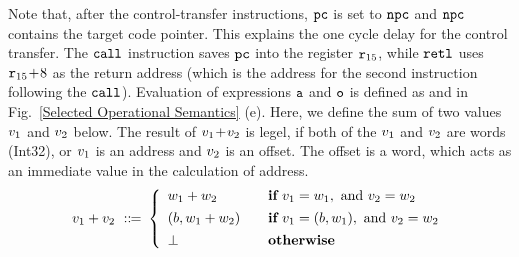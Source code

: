 Note that, after the control-transfer instructions, $\texttt{pc}$ is set
to $\texttt{npc}$ and $\texttt{npc}$ contains the target code pointer. This explains
the one cycle delay for the control transfer.
The $\texttt{call}$ instruction saves $\texttt{pc}$ into the register $\texttt{r}_{15}$,
while $\texttt{retl}$ uses $\texttt{r}_{15} \!+\! 8$ as the
return address (which is the address for the second instruction
following the $\texttt{call}$). Evaluation of
expressions $\texttt{a}$ and $\texttt{o}$ is defined
as 
and 
in Fig.~\ref{Selected Operational Semantics} (e). 
Here, we define the sum of two values $v_1$ 
and $v_2$ below. The result of $v_1\!+\!v_2$ 
is legel, if both of the $v_1$ and $v_2$ 
are words (Int32), or $v_1$ is an address and 
$v_2$ is an offset. The offset is a word, 
which acts as an immediate value in the 
calculation of address.
\[
	\val_1 + \val_2 \ \define \ 
	\left\{
		\begin{array}{ll}
			\word_1 + \word_2 & \quad \cif \  
				\val_1 = \word_1, \text{ and } 
				\val_2 = \word_2 \\
			\\[-8pt]
			(\block, \word_1 + \word_2) & \quad 
				\cif \ 
				\val_1 = (\block, \word_1), 
				\text{ and } 
				\val_2 = \word_2 \\
			\\[-8pt]
			\perp & \quad \otherwise
		\end{array}
	\right.
\]
%



